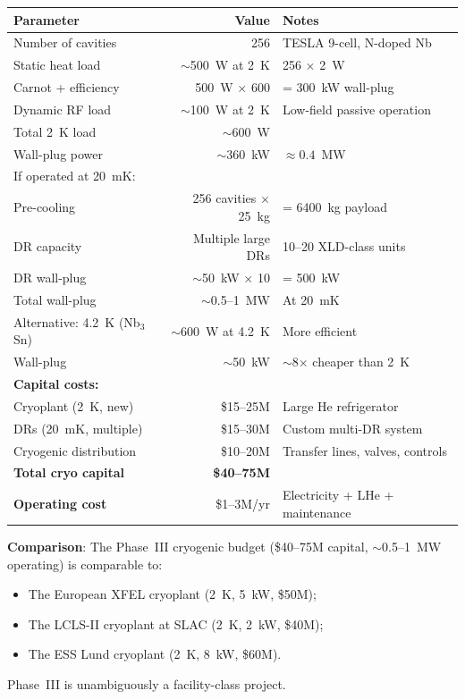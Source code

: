 \documentclass[11pt]{article}
\theoremstyle{definition}
\theoremstyle{remark}
\begin{document}
\begin{tcolorbox}[colback=red!5!white, colframe=red!50!black,
  title=\textbf{PHASE~III CRYOGENIC COST: FACILITY-CLASS INVESTMENT}]

\begin{center}
\renewcommand{\arraystretch}{1.3}
\begin{tabular}{lrl}
\toprule
Parameter & Value & Notes \\
\midrule
Number of cavities & 256 & TESLA 9-cell, N-doped Nb \\
Static heat load & $\sim$500~W at 2~K & 256 $\times$ 2~W \\
Carnot + efficiency & 500~W $\times$ 600 & = 300~kW wall-plug \\
Dynamic RF load & $\sim$100~W at 2~K & Low-field passive operation \\
Total 2~K load & $\sim$600~W & \\
Wall-plug power & $\sim$360~kW & $\approx 0.4$~MW \\
\midrule
If operated at 20~mK: & & \\
\quad Pre-cooling & 256 cavities $\times$ 25~kg & = 6400~kg payload \\
\quad DR capacity & Multiple large DRs & 10--20 XLD-class units \\
\quad DR wall-plug & $\sim$50~kW $\times$ 10 & = 500~kW \\
\quad Total wall-plug & $\sim$0.5--1~MW & At 20~mK \\
\midrule
Alternative: 4.2~K (Nb$_3$Sn) & $\sim$600~W at 4.2~K & More efficient \\
\quad Wall-plug & $\sim$50~kW & $\sim$8$\times$ cheaper than 2~K \\
\midrule
\textbf{Capital costs:} & & \\
Cryoplant (2~K, new) & \$15--25M & Large He refrigerator \\
DRs (20~mK, multiple) & \$15--30M & Custom multi-DR system \\
Cryogenic distribution & \$10--20M & Transfer lines, valves, controls \\
\textbf{Total cryo capital} & \textbf{\$40--75M} & \\
\midrule
\textbf{Operating cost} & \$1--3M/yr & Electricity + LHe + maintenance \\
\bottomrule
\end{tabular}
\end{center}

\textbf{Comparison}: The Phase~III cryogenic budget (\$40--75M capital,
$\sim$0.5--1~MW operating) is comparable to:
\begin{itemize}[nosep]
  \item The European XFEL cryoplant (2~K, 5~kW, \$50M);
  \item The LCLS-II cryoplant at SLAC (2~K, 2~kW, \$40M);
  \item The ESS Lund cryoplant (2~K, 8~kW, \$60M).
\end{itemize}
Phase~III is unambiguously a facility-class project.
\end{tcolorbox}
\end{document}

